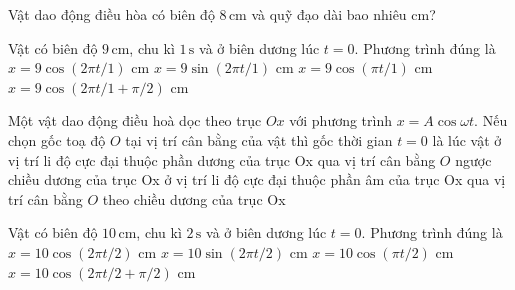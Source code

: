 \begin{ex}
Vật dao động điều hòa có biên độ $8\,\text{cm}$ và quỹ đạo dài bao nhiêu cm?
\end{ex}

\begin{ex}
Vật có biên độ $9\,\text{cm}$, chu kì $1\,\text{s}$ và ở biên dương lúc $t=0$. Phương trình đúng là
\choice
{\True $x=9\cos(2\pi t/1)$ cm}
{$x=9\sin(2\pi t/1)$ cm}
{$x=9\cos(\pi t/1)$ cm}
{$x=9\cos(2\pi t/1+\pi/2)$ cm}
\end{ex}

\begin{ex}
Một vật dao động điều hoà dọc theo trục $Ox$ với phương trình $x=A\cos \omega t$. Nếu chọn gốc toạ độ $O$ tại vị trí cân bằng của vật thì gốc thời gian $t=0$ là lúc vật
\choice
{\True ở vị trí li độ cực đại thuộc phần dương của trục Ox}
{qua vị trí cân bằng $O$ ngược chiều dương của trục Ox}
{ở vị trí li độ cực đại thuộc phần âm của trục Ox}
{qua vị trí cân bằng $O$ theo chiều dương của trục Ox}
\end{ex}

\begin{ex}
Vật có biên độ $10\,\text{cm}$, chu kì $2\,\text{s}$ và ở biên dương lúc $t=0$. Phương trình đúng là
\choice
{\True $x=10\cos(2\pi t/2)$ cm}
{$x=10\sin(2\pi t/2)$ cm}
{$x=10\cos(\pi t/2)$ cm}
{$x=10\cos(2\pi t/2+\pi/2)$ cm}
\end{ex}

